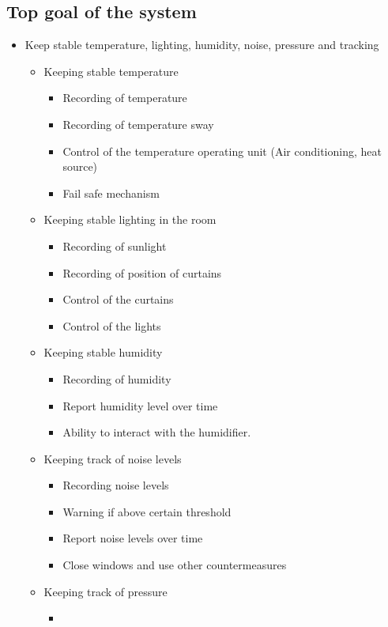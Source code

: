 \documentclass[../document]{subfiles}
\begin{document}
\subsection{Top goal of the system}
\begin{itemize}
	\item
	Keep stable temperature, lighting, humidity, noise, pressure and tracking
	\begin{itemize}
		\item
		Keeping stable temperature
		\begin{itemize}
			\item
			Recording of temperature
			\item
			Recording of temperature sway
			\item
			Control of the temperature operating unit (Air conditioning, heat source)
			\item
			Fail safe mechanism
		\end{itemize}
		\item
		Keeping stable lighting in the room
		\begin{itemize}
			\item
			Recording of sunlight
			\item
			Recording of position of curtains
			\item
			Control of the curtains
			\item
			Control of the lights
		\end{itemize}
		\item
		Keeping stable humidity
		\begin{itemize}
			\item
			Recording of humidity
			\item
			Report humidity level over time
			\item
			Ability to interact with the humidifier.
		\end{itemize}
		\item
		Keeping track of noise levels
		\begin{itemize}
			\item
			Recording noise levels
			\item
			Warning if above certain threshold 
			\item
			Report noise levels over time 
			\item
			Close windows and use other countermeasures
		\end{itemize}
		\item
		Keeping track of pressure
		\begin{itemize}
			\item

\end{itemize}
\end{itemize}
\end{itemize}
\end{document}
